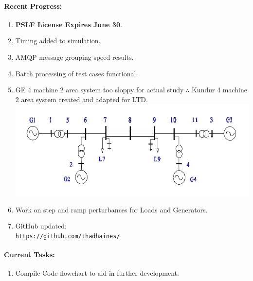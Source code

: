 \documentclass[12pt]{article}
\begin{document}
\begin{multicols}{2}
\raggedright
	\paragraph{Recent Progress:}
	\begin{enumerate}

		\item \textbf{PSLF License Expires June 30}.

		\item Timing added to simulation.

		\item AMQP message grouping speed results.

		\item Batch processing of test cases functional.

		\item GE 4 machine 2 area system too sloppy for actual study $\therefore$
		Kundur 4 machine 2 area system created and adapted for LTD. %
\includegraphics[width=\linewidth]{kundur}
		\item Work on step and ramp perturbances for Loads and Generators.
		

		\item GitHub updated:\\
		\verb|https://github.com/thadhaines/|
		
	\end{enumerate}
\paragraph{Current Tasks:}
	\begin{enumerate}

		\item Compile Code flowchart to aid in further development.


\end{enumerate}
\end{multicols}
\end{document}
